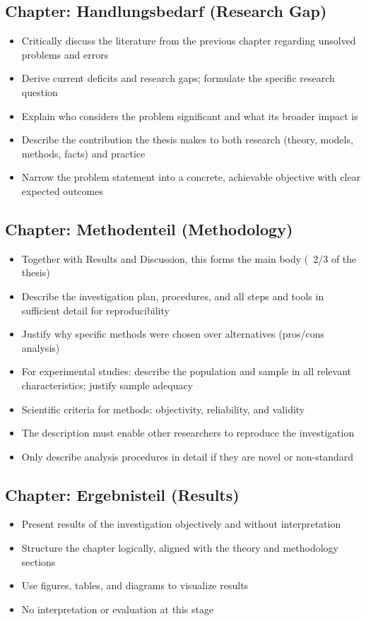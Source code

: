 \subsection{Chapter: Handlungsbedarf (Research Gap)}
\begin{itemize}
    \item Critically discuss the literature from the previous chapter regarding unsolved problems and errors
    \item Derive current deficits and research gaps; formulate the specific research question
    \item Explain who considers the problem significant and what its broader impact is
    \item Describe the contribution the thesis makes to both research (theory, models, methods, facts) and practice
    \item Narrow the problem statement into a concrete, achievable objective with clear expected outcomes
\end{itemize}

\subsection{Chapter: Methodenteil (Methodology)}
\begin{itemize}
    \item Together with Results and Discussion, this forms the main body (~2/3 of the thesis)
    \item Describe the investigation plan, procedures, and all steps and tools in sufficient detail for reproducibility
    \item Justify why specific methods were chosen over alternatives (pros/cons analysis)
    \item For experimental studies: describe the population and sample in all relevant characteristics; justify sample adequacy
    \item Scientific criteria for methods: objectivity, reliability, and validity
    \item The description must enable other researchers to reproduce the investigation
    \item Only describe analysis procedures in detail if they are novel or non-standard
\end{itemize}

\subsection{Chapter: Ergebnisteil (Results)}
\begin{itemize}
    \item Present results of the investigation objectively and without interpretation
    \item Structure the chapter logically, aligned with the theory and methodology sections
    \item Use figures, tables, and diagrams to visualize results
    \item No interpretation or evaluation at this stage
\end{itemize}

